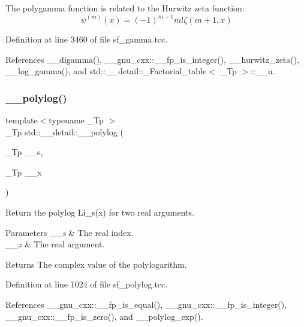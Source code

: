 The polygamma function is related to the Hurwitz zeta function\+: \[ \psi^{(m)}(x) = (-1)^{m+1} m! \zeta(m+1,x) \] 

Definition at line 3460 of file sf\+\_\+gamma.\+tcc.



References \+\_\+\+\_\+digamma(), \+\_\+\+\_\+gnu\+\_\+cxx\+::\+\_\+\+\_\+fp\+\_\+is\+\_\+integer(), \+\_\+\+\_\+hurwitz\+\_\+zeta(), \+\_\+\+\_\+log\+\_\+gamma(), and std\+::\+\_\+\+\_\+detail\+::\+\_\+\+Factorial\+\_\+table$<$ \+\_\+\+Tp $>$\+::\+\_\+\+\_\+n.

\mbox{\label{namespacestd_1_1____detail_a17fb8cea11706f319aaea277188a29c8}} 
\subsubsection{\texorpdfstring{\+\_\+\+\_\+polylog()}{\_\_polylog()}\hspace{0.1cm}{\footnotesize\ttfamily [1/2]}}
{\footnotesize\ttfamily template$<$typename \+\_\+\+Tp $>$ \\
\+\_\+\+Tp std\+::\+\_\+\+\_\+detail\+::\+\_\+\+\_\+polylog (\begin{DoxyParamCaption}\item[{\+\_\+\+Tp}]{\+\_\+\+\_\+s,  }\item[{\+\_\+\+Tp}]{\+\_\+\+\_\+x }\end{DoxyParamCaption})}

Return the polylog Li\+\_\+s(x) for two real arguments.


\begin{DoxyParams}{Parameters}
{\em \+\_\+\+\_\+s} & The real index. \\
\hline
{\em \+\_\+\+\_\+x} & The real argument. \\
\hline
\end{DoxyParams}
\begin{DoxyReturn}{Returns}
The complex value of the polylogarithm. 
\end{DoxyReturn}


Definition at line 1024 of file sf\+\_\+polylog.\+tcc.



References \+\_\+\+\_\+gnu\+\_\+cxx\+::\+\_\+\+\_\+fp\+\_\+is\+\_\+equal(), \+\_\+\+\_\+gnu\+\_\+cxx\+::\+\_\+\+\_\+fp\+\_\+is\+\_\+integer(), \+\_\+\+\_\+gnu\+\_\+cxx\+::\+\_\+\+\_\+fp\+\_\+is\+\_\+zero(), and \+\_\+\+\_\+polylog\+\_\+exp().



